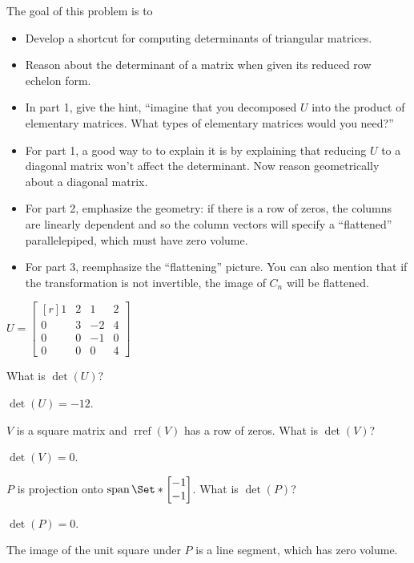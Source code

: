 \documentclass{problemset}
\DeclareMathOperator{\Span}{span}
\DeclareMathOperator{\Rref}{rref}
\newcommand{\mat}[1]{\begin{bmatrix*}[r]#1\end{bmatrix*}}
\begin{document}
	\question
	\begin{annotation}
		\begin{goals}

			The goal of this problem is to
			\begin{itemize}
				\item Develop a shortcut for computing determinants of triangular matrices.
				\item Reason about the determinant of a matrix when given its reduced
					row echelon form.
			\end{itemize}
		\end{goals}

		\begin{notes}
			\begin{itemize}
				\item In part 1, give the hint, ``imagine that you decomposed
					$U$ into the product of elementary matrices. What types of
					elementary matrices would you need?''
				\item For part 1, a good way to to explain it is by explaining that 
					reducing $U$ to a diagonal matrix won't affect the determinant.
					Now reason geometrically about a diagonal matrix.
				\item For part 2, emphasize the geometry: if there is a row of zeros, 
					the columns are linearly dependent and so the column vectors will
					specify a ``flattened'' parallelepiped, which must have zero volume.
				\item For part 3, reemphasize the ``flattening'' picture. You can also mention
					that if the transformation is not invertible, the image of $C_n$ will
					be flattened.
			\end{itemize}
		\end{notes}
	\end{annotation}
	$U=\mat{1&2&1&2\\0&3&-2&4\\0&0&-1&0\\0&0&0&4}$
	\begin{parts}
		\item What is $\det(U)$?
			\begin{solution}
				$\det(U)=-12$.
			\end{solution}
		\item $V$ is a square matrix and $\Rref(V)$ has a row of zeros.
			What is $\det(V)$?
			\begin{solution}
				$\det(V)=0$.
			\end{solution}
		\item $P$ is projection onto $\Span\Set*{\mat{-1\\-1}}$. What is $\det(P)$?
			\begin{solution}
				$\det(P)=0$.

				The image of the unit square under $P$ is a line segment, which
				has zero volume.
			\end{solution}
	\end{parts}
\end{document}
